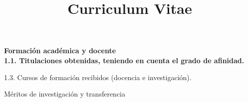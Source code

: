 \documentclass[a4paper,skipsamekey,11pt,english]{curve}
\title{Curriculum Vitae}
\begin{document}
 \makeheaders[c]

\textbf{
\large{Formación académica y docente\\}
1.1. Titulaciones obtenidas, teniendo en cuenta el grado de afinidad.}

1.3. Cursos de formación recibidos (docencia e investigación).


\large{Méritos de investigación y transferencia}




\end{document}
